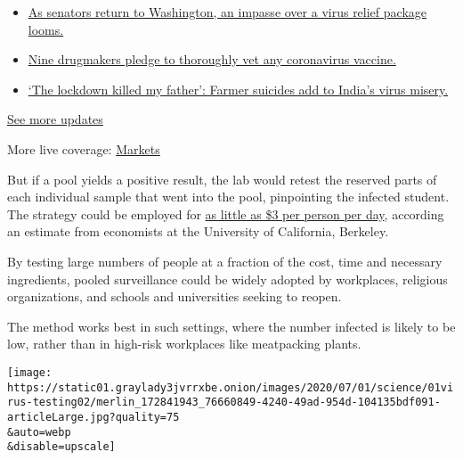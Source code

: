 \begin{itemize}
\tightlist
\item
  \href{https://www.nytimes3xbfgragh.onion/2020/09/08/world/covid-19-coronavirus.html?action=click\&pgtype=Article\&state=default\&region=MAIN_CONTENT_1\&context=storylines_live_updates\#link-4a77847f}{As
  senators return to Washington, an impasse over a virus relief package
  looms.}
\item
  \href{https://www.nytimes3xbfgragh.onion/2020/09/08/world/covid-19-coronavirus.html?action=click\&pgtype=Article\&state=default\&region=MAIN_CONTENT_1\&context=storylines_live_updates\#link-679303d7}{Nine
  drugmakers pledge to thoroughly vet any coronavirus vaccine.}
\item
  \href{https://www.nytimes3xbfgragh.onion/2020/09/08/world/covid-19-coronavirus.html?action=click\&pgtype=Article\&state=default\&region=MAIN_CONTENT_1\&context=storylines_live_updates\#link-1c973131}{`The
  lockdown killed my father': Farmer suicides add to India's virus
  misery.}
\end{itemize}

\href{https://www.nytimes3xbfgragh.onion/2020/09/08/world/covid-19-coronavirus.html?action=click\&pgtype=Article\&state=default\&region=MAIN_CONTENT_1\&context=storylines_live_updates}{See
more updates}

More live coverage:
\href{https://www.nytimes3xbfgragh.onion/live/2020/09/08/business/stock-market-today-coronavirus?action=click\&pgtype=Article\&state=default\&region=MAIN_CONTENT_1\&context=storylines_live_updates}{Markets}

But if a pool yields a positive result, the lab would retest the
reserved parts of each individual sample that went into the pool,
pinpointing the infected student. The strategy could be employed for
\href{http://faculty.haas.berkeley.edu/ned/GroupTestingInAPandemic.pdf}{as
little as \$3 per person per day}, according an estimate from economists
at the University of California, Berkeley.

By testing large numbers of people at a fraction of the cost, time and
necessary ingredients, pooled surveillance could be widely adopted by
workplaces, religious organizations, and schools and universities
seeking to reopen.

The method works best in such settings, where the number infected is
likely to be low, rather than in high-risk workplaces like meatpacking
plants.

\texttt{[image: https://static01.graylady3jvrrxbe.onion/images/2020/07/01/science/01virus-testing02/merlin\_172841943\_76660849-4240-49ad-954d-104135bdf091-articleLarge.jpg?quality=75\\\&auto=webp\\\&disable=upscale]}

